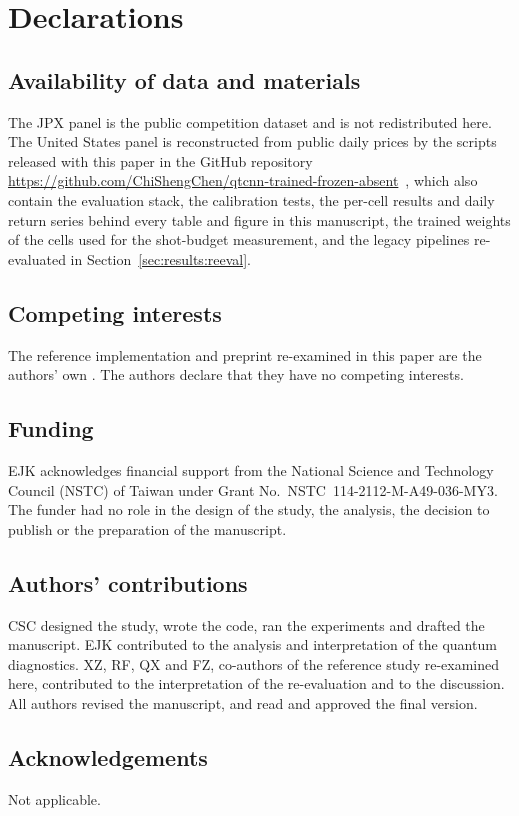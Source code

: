 \documentclass[11pt,a4paper]{article}
\begin{document}
\section*{Declarations}

\subsection*{Availability of data and materials}
The JPX panel is the public competition dataset \citep{jpx2022competition} and
is not redistributed here. The United States panel is reconstructed from public
daily prices by the scripts released with this paper in the GitHub repository
\url{https://github.com/ChiShengChen/qtcnn-trained-frozen-absent}~\citep{chen2026repo}, which also
contain the evaluation stack, the calibration tests, the per-cell results and
daily return series behind every table and figure in this manuscript, the
trained weights of the cells used for the shot-budget measurement, and the
legacy pipelines re-evaluated in Section~\ref{sec:results:reeval}.

\subsection*{Competing interests}
The reference implementation and preprint re-examined in this paper are
the authors' own \citep{chen2025quantumb}. The authors declare that they have no
competing interests.

\subsection*{Funding}
EJK acknowledges financial support from the National Science and Technology
Council (NSTC) of Taiwan under Grant No.~NSTC~114-2112-M-A49-036-MY3. The
funder had no role in the design of the study, the analysis, the decision to
publish or the preparation of the manuscript.

\subsection*{Authors' contributions}
CSC designed the study, wrote the code, ran the experiments and drafted the
manuscript. EJK contributed to the analysis and interpretation of the quantum
diagnostics. XZ, RF, QX and FZ, co-authors of the reference study re-examined
here, contributed to the interpretation of the re-evaluation and to the
discussion. All authors revised the manuscript, and read and approved the
final version.

\subsection*{Acknowledgements}
Not applicable.



\end{document}
